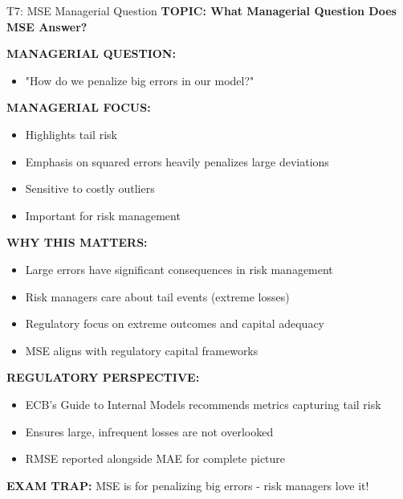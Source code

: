 \documentclass[8pt]{beamer}
\begin{document}
	\begin{frame}{T7: MSE Managerial Question}
		\fontsize{6.5}{7.5}\selectfont
		\textbf{TOPIC: What Managerial Question Does MSE Answer?}
		
		\vspace{0.1cm}
		\textbf{MANAGERIAL QUESTION:}
		\begin{itemize}
			\item "How do we penalize big errors in our model?"
		\end{itemize}
		
		\vspace{0.1cm}
		\textbf{MANAGERIAL FOCUS:}
		\begin{itemize}
			\item Highlights tail risk
			\item Emphasis on squared errors heavily penalizes large deviations
			\item Sensitive to costly outliers
			\item Important for risk management
		\end{itemize}
		
		\vspace{0.1cm}
		\textbf{WHY THIS MATTERS:}
		\begin{itemize}
			\item Large errors have significant consequences in risk management
			\item Risk managers care about tail events (extreme losses)
			\item Regulatory focus on extreme outcomes and capital adequacy
			\item MSE aligns with regulatory capital frameworks
		\end{itemize}
		
		\vspace{0.1cm}
		\textbf{REGULATORY PERSPECTIVE:}
		\begin{itemize}
			\item ECB's Guide to Internal Models recommends metrics capturing tail risk
			\item Ensures large, infrequent losses are not overlooked
			\item RMSE reported alongside MAE for complete picture
		\end{itemize}
		
		\textcolor{myred}{\textbf{EXAM TRAP:}} MSE is for \textcolor{myblue}{penalizing big errors} - risk managers love it!
	\end{frame}
	
\end{document}
